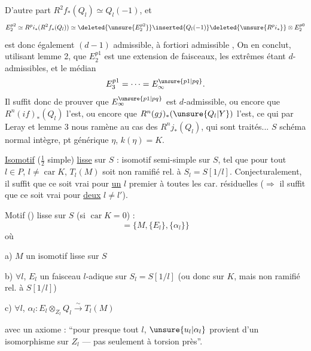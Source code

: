  D'autre part \(R^2f_*(Q_l)\simeq Q_l(-1)\), et
\[
E_2^{p2}\simeq R^pi_*(R^2f_*(Q_l))
\simeq\deleted{\unsure{E_2^{p2}}}
\inserted{Q_l(-1)}\deleted{\unsure{R^pi_*}}\otimes E_2^{p0}
\]
est donc également \((d-1)\) admissible, à fortiori
admissible
,
 On en conclut, utilisant lemme 2,
que \(E_2^{p1}\) est une extension de  faisceaux,
les extrêmes étant  \(d\)-admissibles,
et le médian 
\[
E_3^{p1}=\cdots=E_\infty^{\unsure{p1|pq}}.
\]
Il suffit donc de prouver que \(E_\infty^{\unsure{p1|pq}}\) est \(d\)-admissible,
ou encore que \(R^n(if)_*(Q_l)\) l'est, ou encore que
\(R^n(gj)_*(\unsure{Q_l|Y})\) l'est,
ce qui par Leray et lemme 3 nous ramène au cas des
\(R^nj_*(Q_l)\), qui sont traités...
\(S\) schéma normal intègre, pt générique \(\eta\), \(k(\eta)=K\).

\uline{Isomotif} (\(\frac12\) simple) \uline{lisse} sur \(S\) :
isomotif semi-simple  sur \(S\), tel que pour tout
\(l\in P\), \(l\ne\operatorname{car}K\), \(T_l(M)\) soit non ramifié rel. à
\(S_l=S[1/l]\).
Conjecturalement, il suffit que ce soit vrai pour \uline{un} \(l\)
premier à toutes les car. résiduelles
(\(\Longrightarrow\) il suffit que ce soit vrai pour \uline{deux} \(l\ne l'\)).

Motif () lisse sur \(S\)
(si \(\operatorname{car}K=0\)) :
\[
=\{M,\{E_l\},\{\alpha_l\}\}
\]
où

a) \(M\) un isomotif lisse sur \(S\)

b) \(\forall l\), \(E_l\) un faisceau \(l\)-adique 
sur \(S_l=S[1/l]\) (ou donc sur \(K\), mais non ramifié rel. à \(S[1/l]\))

c) \(\forall l\), \(\alpha_l:E_l\otimes_{Z_l}Q_l\xrightarrow{\sim}T_l(M)\)

avec un axiome : ``pour presque tout \(l\), \(\unsure{u_l|\alpha_l}\)
provient d'un isomorphisme sur \(Z_l\) --- pas seulement à torsion près''.


